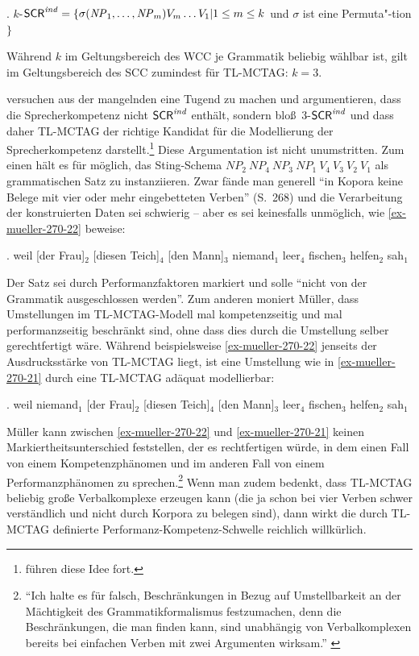 \ex. $k$-$\mathsf{SCR}^{\mathit{ind}} = \{ \sigma(\mathit{NP}_1,\ldots,\mathit{NP}_m) V_m \ldots V_1 | 1 \leq m \leq k$ und $\sigma$ ist eine Permuta"-tion$\}$

Während $k$ im Geltungsbereich des WCC je Grammatik beliebig wählbar ist, gilt im Geltungsbereich des SCC zumindest für TL-MCTAG: $k = 3$.

\cite{Joshi:Becker:Rambow:00} versuchen aus der mangelnden  eine Tugend zu machen und argumentieren, dass die Sprecherkompetenz nicht $\mathsf{SCR}^{\mathit{ind}}$ enthält, sondern blo\ss\ 3-$\mathsf{SCR}^{\mathit{ind}}$ und dass daher TL-MCTAG der richtige Kandidat für die Modellierung der Sprecherkompetenz darstellt.\footnote{\cite{Chen-Main:Joshi:08,Chen-Main:Joshi:12} führen diese Idee fort.} Diese Argumentation ist nicht unumstritten. Zum einen hält es \citet[Abschnitt~10.6.3]{Mueller:10} für möglich, das Sting-Schema $\mathit{NP}_2 ~ \mathit{NP}_4 ~ \mathit{NP}_3 ~ \mathit{NP}_1 ~ V_4 ~ V_3 ~ V_2 ~ V_1$ als grammatischen Satz zu instanziieren. Zwar fände man generell "`in Kopora keine Belege mit vier oder mehr eingebetteten Verben"' (S.~268) und die Verarbeitung der konstruierten Daten sei schwierig -- aber es sei keinesfalls unmöglich, wie \ref{ex-mueller-270-22} beweise:   

\ex. \label{ex-mueller-270-22}weil [der Frau]$_2$ [diesen Teich]$_4$ [den Mann]$_3$ niemand$_1$ leer$_4$ fischen$_3$ helfen$_2$ sah$_1$ \hfill \citep[270]{Mueller:10}

Der Satz sei durch Performanzfaktoren markiert und solle "`nicht von der Grammatik ausgeschlossen werden"'. Zum anderen moniert Müller, dass Umstellungen im TL-MCTAG-Modell mal kompetenzseitig und mal performanzseitig beschränkt sind, ohne dass dies durch die Umstellung selber gerechtfertigt wäre. Während beispielsweise \ref{ex-mueller-270-22} jenseits der Ausdrucksstärke von TL-MCTAG liegt, ist eine Umstellung wie in \ref{ex-mueller-270-21} durch eine TL-MCTAG adäquat modellierbar: 

\ex. \label{ex-mueller-270-21}weil niemand$_1$ [der Frau]$_2$ [diesen Teich]$_4$ [den Mann]$_3$ leer$_4$ fischen$_3$ helfen$_2$ sah$_1$ \hfill \citep[270]{Mueller:10}

Müller kann zwischen \ref{ex-mueller-270-22} und \ref{ex-mueller-270-21} keinen Markiertheitsunterschied feststellen, der es rechtfertigen würde, in dem einen Fall von einem Kompetenzphänomen und im anderen Fall von einem Performanzphänomen zu sprechen.\footnote{"`Ich halte es für falsch, Beschränkungen in Bezug auf Umstellbarkeit an der Mächtigkeit des Grammatikformalismus festzumachen, denn die Beschränkungen, die man finden kann, sind unabhängig von Verbalkomplexen bereits bei einfachen Verben mit zwei Argumenten wirksam."' \citep[269]{Mueller:10}} Wenn man zudem bedenkt, dass TL-MCTAG beliebig gro\ss e Verbalkomplexe erzeugen kann (die ja schon bei vier Verben schwer verständlich und nicht durch Korpora zu belegen sind), dann wirkt die durch TL-MCTAG definierte Performanz-Kompetenz-Schwelle reichlich willkürlich. %

